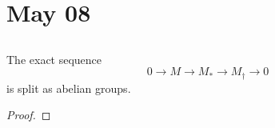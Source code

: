 \section{May 08}


\subsection{}

\begin{lemma}
  The exact sequence
  \[ 0 \to M \to M_* \to M_\dagger \to 0 \]
  is split as abelian groups.
\end{lemma}
\begin{proof}
  \Yang{}
\end{proof}




